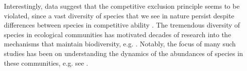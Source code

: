 \documentclass[9pt,lineno]{elife}
\begin{document}


Interestingly, data suggest that the competitive exclusion principle seems to be violated, since a vast diversity of species that we see in nature persist despite differences between species in competitive ability \cite{hutchinson1961paradox,chesson2000mechanisms}. 
The tremendous diversity of species in ecological communities has motivated decades of research into the mechanisms that maintain biodiversity, e.g. \cite{tilman1982resource,loreau1998biodiversity,verberk2011explaining,lynch2015ecology,fowler2013colonization,barabas2016effect,kalmykov2012mechanistic,kalmykov2013verification}. 
Notably, the focus of many such studies has been on understanding the dynamics of the abundances of species in these communities, e.g. see \cite{leidinger2017biodiversity}.
\end{document}
